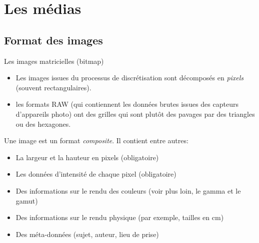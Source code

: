 \section{Les médias}
\subsection{Format des images}
\begin{frame}{Les images matricielles (bitmap)}
  \begin{itemize}
  \item[\dialoginformation] Les images issues du processus de discrétisation
    sont décomposés en \emph{pixels} (souvent rectangulaires).
  \item[\ddialogwarning] les formats RAW (qui contiennent les données brutes
    issues des capteurs d'appareils photo) ont des grilles qui sont plutôt des
    pavages par des triangles ou des hexagones.
  \end{itemize}
  Une image est un format \emph{composite}. Il contient entre autres:
  \begin{itemize}
  \item La largeur et la hauteur en pixels (obligatoire)
  \item Les données d'intensité de chaque pixel (obligatoire)
  \item Des informations sur le rendu des couleurs (voir plus loin, le gamma
    et le gamut)
  \item Des informations sur le rendu physique (par exemple, tailles en cm)
  \item Des méta-données (sujet, auteur, lieu de prise)
  \end{itemize}
\end{frame}

